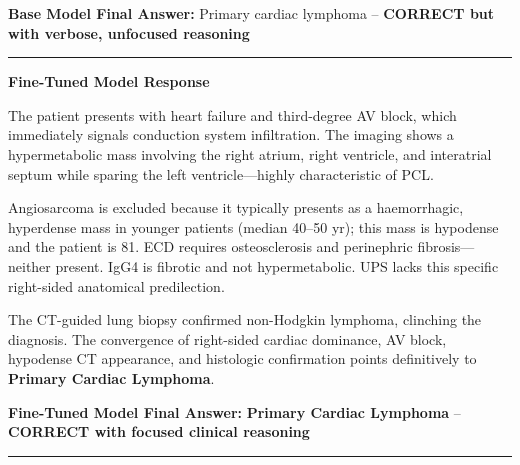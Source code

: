 \documentclass[10pt,journal,compsoc, onecolumn]{IEEEtran}
\begin{document}
\begin{casebox}
    \vspace{1em}
    \noindent\textbf{Base Model Final Answer:} \colorbox{green!30}{Primary cardiac lymphoma} -- \textbf{CORRECT but with verbose, unfocused reasoning}

    \vspace{1em}
    \hrule
    \vspace{1em}

    \textbf{Fine-Tuned Model Response}

    \vspace{0.5em}
    The patient presents with heart failure and \colorbox{yellow!30}{third-degree AV block}, which immediately signals conduction system infiltration. The imaging shows a hypermetabolic mass involving the right atrium, right ventricle, and interatrial septum while \colorbox{yellow!30}{sparing the left ventricle}---highly characteristic of PCL.

    \vspace{0.5em}
    \colorbox{yellow!30}{Angiosarcoma} is excluded because it typically presents as a haemorrhagic, hyperdense mass in younger patients (median 40--50 yr); this mass is hypodense and the patient is 81. \colorbox{yellow!30}{ECD} requires osteosclerosis and perinephric fibrosis---neither present. \colorbox{yellow!30}{IgG4} is fibrotic and not hypermetabolic. \colorbox{yellow!30}{UPS} lacks this specific right-sided anatomical predilection.

    \vspace{0.5em}
    \colorbox{yellow!30}{The CT-guided lung biopsy confirmed non-Hodgkin lymphoma}, clinching the diagnosis. The convergence of right-sided cardiac dominance, AV block, hypodense CT appearance, and histologic confirmation points definitively to \colorbox{green!30}{\textbf{Primary Cardiac Lymphoma}}.

    \vspace{1em}
    \noindent\textbf{Fine-Tuned Model Final Answer:} \colorbox{green!30}{\textbf{Primary Cardiac Lymphoma}} -- \textbf{CORRECT with focused clinical reasoning}

    \vspace{1em}
    \hrule
    \vspace{1em}


\end{casebox}
\end{document}
